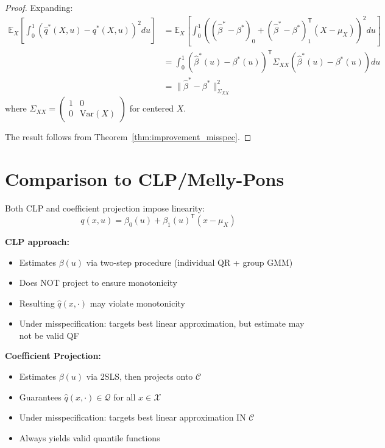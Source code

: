 \documentclass[11pt]{article}
\newcommand{\E}{\mathbb{E}}
\newcommand{\calC}{\mathcal{C}}
\newcommand{\calQ}{\mathcal{Q}}
\newcommand{\T}{\mathsf{T}}
\begin{document}
\begin{proof}
Expanding:
\begin{align}
\E_X\left[ \int_0^1 (\hat{q}^*(X, u) - q^*(X, u))^2 du \right] 
&= \E_X\left[ \int_0^1 \left( (\hat{\beta}^* - \beta^*)_0 + (\hat{\beta}^* - \beta^*)_1^\T(X - \mu_X) \right)^2 du \right] \\
&= \int_0^1 (\hat{\beta}^*(u) - \beta^*(u))^\T \Sigma_{XX} (\hat{\beta}^*(u) - \beta^*(u)) du \\
&= \|\hat{\beta}^* - \beta^*\|_{\Sigma_{XX}}^2
\end{align}
where $\Sigma_{XX} = \begin{pmatrix} 1 & 0 \\ 0 & \text{Var}(X) \end{pmatrix}$ for centered $X$.

The result follows from Theorem~\ref{thm:improvement_misspec}.
\end{proof}

\section{Comparison to CLP/Melly-Pons}

Both CLP and coefficient projection impose linearity:
\[
q(x, u) = \beta_0(u) + \beta_1(u)^\T(x - \mu_X)
\]

\textbf{CLP approach:}
\begin{itemize}
\item Estimates $\beta(u)$ via two-step procedure (individual QR + group GMM)
\item Does NOT project to ensure monotonicity
\item Resulting $\hat{q}(x, \cdot)$ may violate monotonicity
\item Under misspecification: targets best linear approximation, but estimate may not be valid QF
\end{itemize}

\textbf{Coefficient Projection:}
\begin{itemize}
\item Estimates $\beta(u)$ via 2SLS, then projects onto $\calC$
\item Guarantees $\hat{q}(x, \cdot) \in \calQ$ for all $x \in \mathcal{X}$
\item Under misspecification: targets best linear approximation IN $\calC$
\item Always yields valid quantile functions
\end{itemize}
\end{document}
